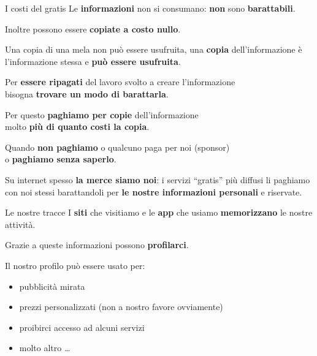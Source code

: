 \begin{myframe}{I costi del gratis}
  Le \textbf{informazioni} non si consumano: \textbf{non} sono \textbf{barattabili}.

  Inoltre possono essere \textbf{copiate a costo nullo}.

  \medskip\pause
  Una copia di una mela non può essere usufruita, una \textbf{copia} dell'informazione è l'informazione stessa e \textbf{può essere usufruita}.

  \pause
  Per \textbf{essere ripagati} del lavoro svolto a creare l'informazione\\bisogna \textbf{trovare un modo di barattarla}.

  Per questo \textbf{paghiamo per copie} dell'informazione\\molto \textbf{più di quanto costi la copia}.

  \medskip\pause
  Quando \textbf{non paghiamo} o qualcuno paga per noi (sponsor)\\o \textbf{paghiamo senza saperlo}.

  Su internet spesso \textbf{la merce siamo noi}: i servizi ``gratis'' più diffusi li paghiamo con noi stessi barattandoli per \textbf{le nostre informazioni personali} e riservate.
\end{myframe}

\begin{myframe}{Le nostre tracce}
  I \textbf{siti} che visitiamo e le \textbf{app} che usiamo \textbf{memorizzano} le nostre attività.

  \pause\medskip
  Grazie a queste informazioni possono \textbf{profilarci}.

  \pause\medskip
  Il nostro profilo può essere usato per:
  \begin{itemize}[<+->]
    \item pubblicità mirata
    \item prezzi personalizzati (non a nostro favore ovviamente)
    \item proibirci accesso ad alcuni servizi
    \item molto altro \dots
  \end{itemize}

\end{myframe}

